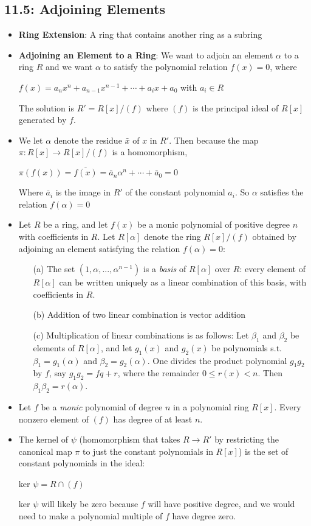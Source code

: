 \documentclass[12pt]{article}
\begin{document}
\subsection*{11.5: Adjoining Elements}
\begin{itemize}
  \item \textbf{Ring Extension}: A ring that contains another ring as a subring
  \item \textbf{Adjoining an Element to a Ring}: We want to adjoin an element $\alpha$ to a ring $R$ and we want $\alpha$ to satisfy the polynomial relation $f(x) = 0$, where
  \begin{center}
    $f(x) = a_nx^n + a_{n-1}x^{n-1} + \cdots + a_ix + a_0$ \quad with $a_i \in R$
  \end{center}
  The solution is $R' = R[x]/(f)$ where $(f)$ is the principal ideal of $R[x]$ generated by $f$.
  \item We let $\alpha$ denote the residue $\bar{x}$ of $x$ in $R'$. Then because the map $\pi: R[x] \to R[x]/(f)$ is a homomorphism,
  \begin{center}
    $\pi(f(x)) = \overline{f(x)} = \bar{a}_n\alpha^n + \cdots + \bar{a}_0 = 0$
  \end{center}
  Where $\bar{a}_i$ is the image in $R'$ of the constant polynomial $a_i$. So $\alpha$ satisfies the relation $f(\alpha) = 0$
  \item Let $R$ be a ring, and let $f(x)$ be a monic polynomial of positive degree $n$ with coefficients in $R$. Let $R[\alpha]$ denote the ring $R[x]/(f)$ obtained by adjoining an element satisfying the relation $f(\alpha) = 0$:
  \begin{enumerate}
    \item[(a)] The set $(1, \alpha, ..., \alpha^{n-1})$ is a \textit{basis} of $R[\alpha]$ over $R$: every element of $R[\alpha]$ can be written uniquely as a linear combination of this basis, with coefficients in   $R$.
    \item[(b)] Addition of two linear combination is vector addition
    \item[(c)] Multiplication of linear combinations is as follows: Let $\beta_1$ and $\beta_2$ be elements of $R[\alpha]$, and let $g_1(x)$ and $g_2(x)$ be polynomials s.t. $\beta_1 = g_1(\alpha)$ and $\beta_2 = g_2(\alpha)$. One divides the product polynomial $g_1g_2$ by $f$, say $g_1g_2 = fq + r$, where the remainder $0 \leqslant r(x) < n$. Then $\beta_1\beta_2 = r(\alpha)$.
  \end{enumerate}
  \item Let $f$ be a \textit{monic} polynomial of degree $n$ in a polynomial ring $R[x]$. Every nonzero element of $(f)$ has degree of at least $n$.
  \item The kernel of $\psi$ (homomorphism that takes $R \to R'$ by restricting the canonical map $\pi$ to just the constant polynomials in $R[x]$) is the set of constant polynomials in the ideal:
  \begin{center}
    ker $\psi = R \cap (f)$
  \end{center}
  ker $\psi$ will likely be zero because $f$ will have positive degree, and we would need to make a polynomial multiple of $f$ have degree zero.
\end{itemize}
\end{document}
